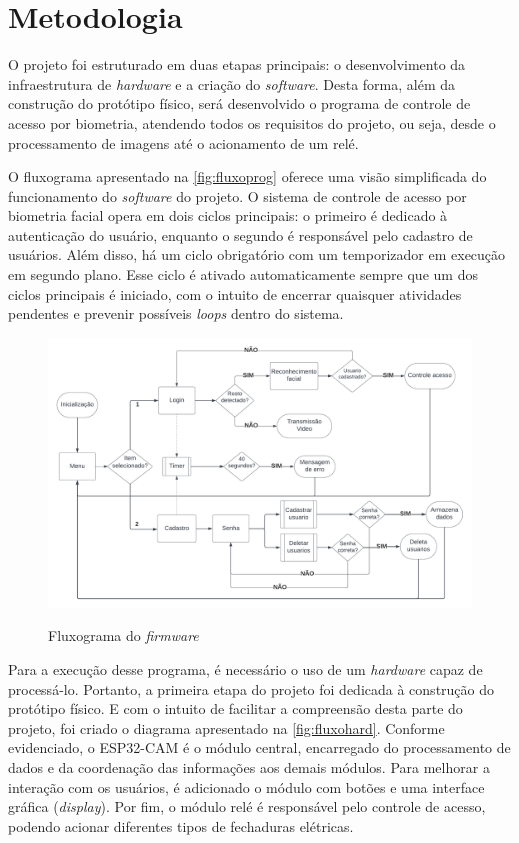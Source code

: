 
\chapter{Metodologia}\label{cap:materialemetodos}

O projeto foi estruturado em duas etapas principais: o desenvolvimento da
infraestrutura de \textit{hardware} e a criação do \textit{software}.
Desta forma, além da construção do protótipo físico, será desenvolvido
o programa de controle de acesso por biometria, atendendo todos
os requisitos do projeto, ou seja, desde o processamento de imagens
até o acionamento de um relé.

O fluxograma apresentado na \autoref{fig:fluxoprog} oferece uma visão
simplificada do funcionamento do \textit{software} do projeto. O sistema
de controle de acesso por biometria facial opera em dois ciclos principais:
o primeiro é dedicado à autenticação do usuário, enquanto o segundo é responsável
pelo cadastro de usuários. Além disso, há um ciclo obrigatório com um
temporizador em execução em segundo plano. Esse ciclo é ativado
automaticamente sempre que um dos ciclos principais é iniciado, com o intuito
de encerrar quaisquer atividades pendentes e prevenir possíveis \textit{loops}
dentro do sistema.

\begin{figure}[h!]
    \centering
    \caption{Fluxograma do \textit{firmware}}
    \includegraphics[scale=0.25]{figuras/fluxo_app.png}
    \fonte{}%
    \label{fig:fluxoprog}
    \centering
\end{figure}

Para a execução desse programa, é necessário o uso de um \textit{hardware}
capaz de processá-lo. Portanto, a primeira etapa do projeto foi dedicada à
construção do protótipo físico. E com o intuito de facilitar a compreensão desta
parte do projeto, foi criado o diagrama apresentado na \autoref{fig:fluxohard}.
Conforme evidenciado, o ESP32-CAM é o módulo central, encarregado do
processamento de dados e da coordenação das informações aos demais módulos.
Para melhorar a interação com os usuários, é adicionado o módulo com botões e
uma interface gráfica (\textit{display}). Por fim, o módulo relé é
responsável pelo controle de acesso, podendo acionar diferentes tipos de
fechaduras elétricas.

